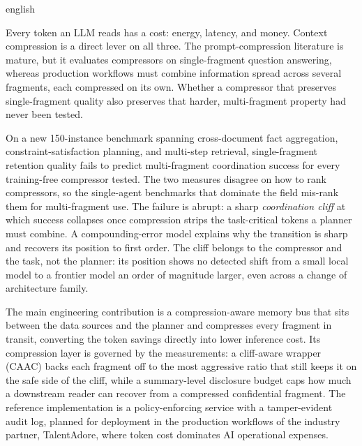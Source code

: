 \begin{thesisabstract}{english}

Every token an LLM reads has a cost: energy, latency,
and money. Context compression is a direct lever on all three. The
prompt-compression literature is mature, but it evaluates compressors
on single-fragment question answering, whereas production workflows
must combine information spread across several fragments, each
compressed on its own. Whether a compressor that preserves
single-fragment quality also preserves that harder, multi-fragment
property had never been tested.

On a new 150-instance benchmark spanning cross-document
fact aggregation, constraint-satisfaction planning, and multi-step
retrieval, single-fragment retention quality fails to predict
multi-fragment coordination success for every training-free
compressor tested. The two measures disagree on how to rank
compressors, so the single-agent benchmarks that dominate the field
mis-rank them for multi-fragment use. The failure is abrupt: a sharp \emph{coordination cliff} at which success collapses once compression strips the task-critical tokens a planner
must combine. A compounding-error model explains why the transition
is sharp and recovers its position to first order. The cliff belongs to the compressor and the task, not the planner: its position shows no detected shift from a small local model to a frontier model an order of magnitude larger, even across a change of architecture family.

The main engineering contribution is a compression-aware memory bus that sits between the data sources and the planner and compresses every fragment in transit, converting the token savings directly into lower inference cost. Its compression layer is governed by the measurements: a cliff-aware wrapper (CAAC) backs each fragment off to the most aggressive ratio that still keeps it on the safe side of the cliff, while a summary-level disclosure budget caps how much a downstream reader can recover from a compressed confidential fragment. The reference implementation is a policy-enforcing service with a tamper-evident audit log, planned for deployment in the production workflows of the industry partner, TalentAdore, where token cost dominates AI operational expenses.

\end{thesisabstract}
